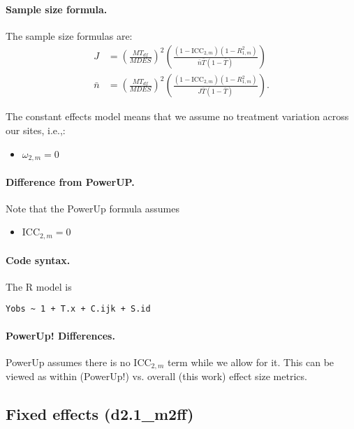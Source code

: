 \documentclass[12pt]{article}
\begin{document}
\paragraph{Sample size formula.} 
The sample size formulas are:
\begin{align}
J &= \left(\frac{MT_{df}}{MDES}\right)^2 \left(\frac{(1-\text{ICC}_{2,m})(1-R^2_{1,m})}{\bar{n} \bar{T} (1 - \bar{T})} \right)\\
\bar{n} &= \left(\frac{MT_{df}}{MDES}\right)^2 \left(\frac{(1-\text{ICC}_{2,m})(1-R^2_{1,m})}{J \bar{T} (1 - \bar{T})} \right) .
\end{align}

The constant effects model means that we assume no treatment variation across our sites, i.e.,:
\begin{itemize}
\item $\omega_{2,m} = 0$
\end{itemize}

\paragraph{Difference from PowerUP.}

Note that the PowerUp formula assumes
\begin{itemize}
\item $\text{ICC}_{2,m} = 0$
\end{itemize}

\paragraph{Code syntax.}
The R model is
\begin{verbatim}
Yobs ~ 1 + T.x + C.ijk + S.id
\end{verbatim}


\paragraph{PowerUp! Differences.}
PowerUp assumes there is no $\text{ICC}_{2,m}$ term while we allow for it.
This can be viewed as within (PowerUp!) vs. overall (this work) effect size metrics.


\newpage 
\subsection{Fixed effects (d2.1\_m2ff)}
\end{document}
